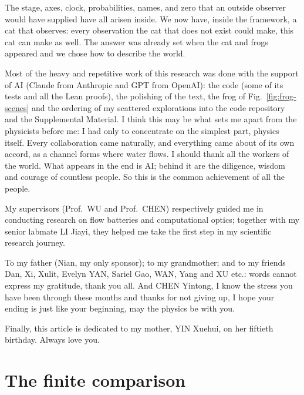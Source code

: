 \documentclass[aps,prx,reprint,longbibliography]{revtex4-2}
\begin{document}
The stage, axes, clock, probabilities, names, and zero that an outside observer would have supplied have all arisen inside. We now have, inside the framework, a cat that observes: every observation the cat that does not exist could make, this cat can make as well. The answer was already set when the cat and frogs appeared and we chose how to describe the world.

\begin{acknowledgments}
Most of the heavy and repetitive work of this research was done with the support of AI (Claude from Anthropic and GPT from OpenAI): the code (some of its tests and all the Lean proofs), the polishing of the text, the frog of Fig.~\ref{fig:frog-scenes} and the ordering of my scattered explorations into the code repository and the Supplemental Material. I think this may be what sets me apart from the physicists before me: I had only to concentrate on the simplest part, physics itself. Every collaboration came naturally, and everything came about of its own accord, as a channel forms where water flows. I should thank all the workers of the world. What appears in the end is AI; behind it are the diligence, wisdom and courage of countless people. So this is the common achievement of all the people.

My supervisors (Prof.~WU and Prof.~CHEN) respectively guided me in conducting research on flow batteries and computational optics; together with my senior labmate LI Jiayi, they helped me take the first step in my scientific research journey.

To my father (Nian, my only sponsor); to my grandmother; and to my friends Dan, Xi, Xulit, Evelyn YAN, Sariel Gao, WAN, Yang and XU etc.: words cannot express my gratitude, thank you all. And CHEN Yintong, I know the stress you have been through these months and thanks for not giving up, I hope your ending is just like your beginning, may the physics be with you.

Finally, this article is dedicated to my mother, YIN Xuehui, on her fiftieth birthday. Always love you.
\end{acknowledgments}




\appendix
{}

\section{The finite comparison}
\label{app:geometry}
\end{document}
